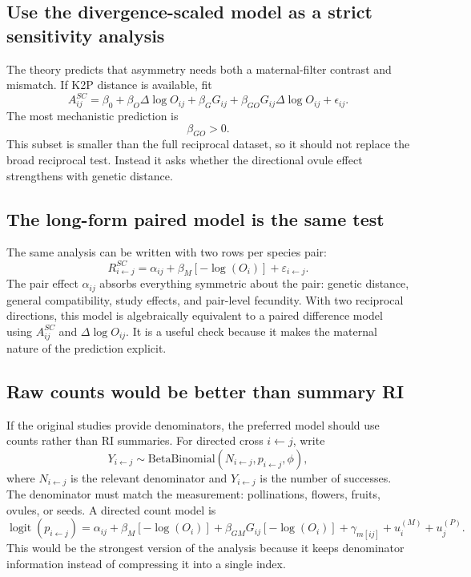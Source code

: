 \documentclass[12pt]{article}
\newcommand{\logit}{\operatorname{logit}}
\begin{document}
\subsection{Use the divergence-scaled model as a strict sensitivity analysis}

The theory predicts that asymmetry needs both a maternal-filter contrast and mismatch. If K2P distance is available, fit
\begin{equation}
A^{SC}_{ij}=\beta_0+\beta_O\Delta\log O_{ij}+\beta_GG_{ij}+\beta_{GO}G_{ij}\Delta\log O_{ij}+\epsilon_{ij}.
\label{eq:strict-G-analysis}
\end{equation}
The most mechanistic prediction is
\begin{equation}
\boxed{\beta_{GO}>0.}
\end{equation}
This subset is smaller than the full reciprocal dataset, so it should not replace the broad reciprocal test. Instead it asks whether the directional ovule effect strengthens with genetic distance.

\subsection{The long-form paired model is the same test}

The same analysis can be written with two rows per species pair:
\begin{equation}
R^{SC}_{i\leftarrow j}=\alpha_{ij}+\beta_M[-\log(O_i)]+\varepsilon_{i\leftarrow j}.
\label{eq:long-pair-analysis}
\end{equation}
The pair effect $\alpha_{ij}$ absorbs everything symmetric about the pair: genetic distance, general compatibility, study effects, and pair-level fecundity. With two reciprocal directions, this model is algebraically equivalent to a paired difference model using $A^{SC}_{ij}$ and $\Delta\log O_{ij}$. It is a useful check because it makes the maternal nature of the prediction explicit.

\subsection{Raw counts would be better than summary RI}

If the original studies provide denominators, the preferred model should use counts rather than RI summaries. For directed cross $i\leftarrow j$, write
\begin{equation}
Y_{i\leftarrow j}\sim \mathrm{BetaBinomial}(N_{i\leftarrow j},p_{i\leftarrow j},\phi),
\label{eq:raw-count-analysis}
\end{equation}
where $N_{i\leftarrow j}$ is the relevant denominator and $Y_{i\leftarrow j}$ is the number of successes. The denominator must match the measurement: pollinations, flowers, fruits, ovules, or seeds. A directed count model is
\begin{equation}
\logit(p_{i\leftarrow j})=\alpha_{ij}
+\beta_M[-\log(O_i)]
+\beta_{GM}G_{ij}[-\log(O_i)]
+\gamma_{m[ij]}+u_i^{(M)}+u_j^{(P)}.
\label{eq:raw-count-regression}
\end{equation}
This would be the strongest version of the analysis because it keeps denominator information instead of compressing it into a single index.
\end{document}
